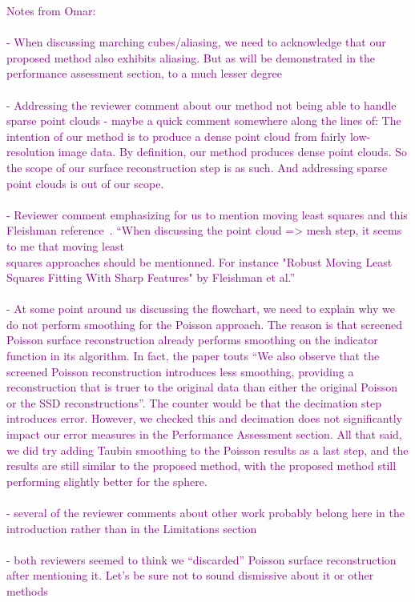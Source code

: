 \textcolor{purple}{
Notes from Omar:\\ \\
- When discussing marching cubes/aliasing, we need to acknowledge that our proposed method also exhibits aliasing. But as will be demonstrated in the performance assessment section, to a much lesser degree\\ \\
- Addressing the reviewer comment about our method not being able to handle sparse point clouds - maybe a quick comment somewhere along the lines of: The intention of our method is to produce a dense point cloud from fairly low-resolution image data. By definition, our method produces dense point clouds. So the scope of our surface reconstruction step is as such. And addressing sparse point clouds is out of our scope.\\ \\
- Reviewer comment emphasizing for us to mention moving least squares and this Fleishman reference~\cite{fleishman2005}. ``When discussing the point cloud => mesh step, it seems to me that moving least\\
squares approaches should be mentionned. For instance "Robust Moving Least
Squares Fitting With Sharp Features" by Fleishman et al.''\\ \\
- At some point around us discussing the flowchart, we need to explain why we do not perform smoothing for the Poisson approach. The reason is that screened Poisson surface reconstruction already performs smoothing on the indicator function in its algorithm. In fact, the paper touts ``We also observe that the screened Poisson reconstruction introduces less smoothing, providing a reconstruction that is truer to the original data than either the original Poisson or the SSD reconstructions''. The counter would be that the decimation step introduces error. However, we checked this and decimation does not significantly impact our error measures in the Performance Assessment section. All that said, we did try adding Taubin smoothing to the Poisson results as a last step, and the results are still similar to the proposed method, with the proposed method still performing slightly better for the sphere. \\ \\
- several of the reviewer comments about other work probably belong here in the introduction rather than in the Limitations section \\ \\
- both reviewers seemed to think we ``discarded'' Poisson surface reconstruction after mentioning it. Let's be sure not to sound dismissive about it or other methods}